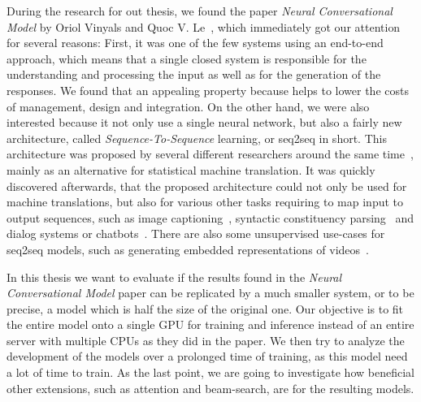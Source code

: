 During the research for out thesis, we found the paper \emph{Neural Conversational Model} by Oriol Vinyals and Quoc V. Le~\cite{Vinyals:2015}, which immediately got our attention for several reasons: First, it was one of the few systems using an end-to-end approach, which means that a single closed system is responsible for the understanding and processing the input as well as for the generation of the responses. We found that an appealing property because helps to lower the costs of management, design and integration. On the other hand, we were also interested because it not only use a single neural network, but also a fairly new architecture, called \emph{Sequence-To-Sequence} learning, or seq2seq in short. This architecture was proposed by several different researchers around the same time~\cite{Sutskever:2014}\cite{Kalchbrenner:2013}\cite{Cho:2014}, mainly as an alternative for statistical machine translation. It was quickly discovered afterwards, that the proposed architecture could not only be used for machine translations, but also for various other tasks requiring to map input to output sequences, such as image captioning~\cite{Xu:2015}, syntactic constituency parsing~\cite{Vinyals:2015:Foreign} and dialog systems or chatbots~\cite{Zivkovic:Trumpbot}\cite{Lison:2016}. There are also some unsupervised use-cases for seq2seq models, such as generating embedded representations of videos~\cite{Nitish:2015}.

In this thesis we want to evaluate if the results found in the \emph{Neural Conversational Model} paper can be replicated by a much smaller system, or to be precise, a model which is half the size of the original one. Our objective is to fit the entire model onto a single GPU for training and inference instead of  an entire server with multiple CPUs as they did in the paper. We then try to analyze the development of the models over a prolonged time of training, as this model need a lot of time to train. As the last point, we are going to investigate how beneficial other extensions, such as attention and beam-search, are for the resulting models.